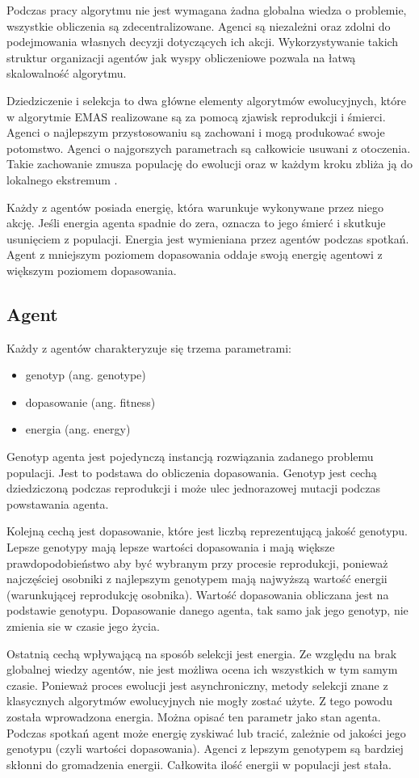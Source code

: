 Podczas pracy algorytmu nie jest wymagana żadna globalna wiedza o problemie, wszystkie obliczenia są zdecentralizowane. Agenci są niezależni oraz zdolni do podejmowania własnych decyzji dotyczących ich akcji. Wykorzystywanie takich struktur organizacji agentów jak wyspy obliczeniowe pozwala na łatwą skalowalność algorytmu. 

Dziedziczenie i selekcja to dwa główne elementy algorytmów ewolucyjnych, które w algorytmie EMAS realizowane są za pomocą zjawisk reprodukcji i śmierci. Agenci o najlepszym przystosowaniu są zachowani i mogą produkować swoje potomstwo. Agenci o najgorszych parametrach są całkowicie usuwani z otoczenia. Takie zachowanie zmusza populację do ewolucji oraz w każdym kroku zbliża ją do lokalnego ekstremum \cite{emas2}.

Każdy z agentów posiada energię, która warunkuje wykonywane przez niego akcję. Jeśli energia agenta spadnie do zera, oznacza to jego śmierć i skutkuje usunięciem z populacji. Energia jest wymieniana przez agentów podczas spotkań. Agent z mniejszym poziomem dopasowania oddaje swoją energię agentowi z większym poziomem dopasowania.

\subsection{Agent}
\label{sec:agentgenetyczny}
Każdy z agentów charakteryzuje się trzema parametrami:
\begin {itemize}
\item genotyp (ang. genotype)
\item dopasowanie (ang. fitness)
\item energia (ang. energy)
\end {itemize}
Genotyp agenta jest pojedynczą instancją rozwiązania zadanego problemu populacji. Jest to podstawa do obliczenia dopasowania. Genotyp jest cechą dziedziczoną podczas reprodukcji i może ulec jednorazowej mutacji podczas powstawania agenta.

Kolejną cechą jest dopasowanie, które jest liczbą reprezentującą jakość genotypu. Lepsze genotypy mają lepsze wartości dopasowania i mają większe prawdopodobieństwo aby być wybranym przy procesie reprodukcji, ponieważ najczęściej osobniki z najlepszym genotypem mają najwyższą wartość energii (warunkującej reprodukcję osobnika). Wartość dopasowania obliczana jest na podstawie genotypu. Dopasowanie danego agenta, tak samo jak jego genotyp, nie zmienia sie w czasie jego życia.

Ostatnią cechą wpływającą na sposób selekcji jest energia. Ze względu na brak globalnej wiedzy agentów, nie jest możliwa ocena ich wszystkich w tym samym czasie. Ponieważ proces ewolucji jest asynchroniczny, metody selekcji znane z klasycznych algorytmów ewolucyjnych nie mogły zostać użyte. Z tego powodu została wprowadzona energia. Można opisać ten parametr jako stan agenta. Podczas spotkań agent może energię zyskiwać lub tracić, zależnie od jakości jego genotypu (czyli wartości dopasowania). Agenci z lepszym genotypem są bardziej skłonni do gromadzenia energii. Całkowita ilość energii w populacji jest stała.

